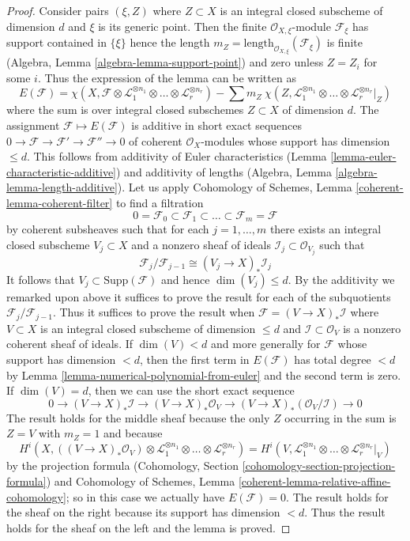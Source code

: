 \begin{proof}
Consider pairs $(\xi , Z)$ where $Z \subset X$ is an integral
closed subscheme of dimension $d$ and $\xi$ is its generic point.
Then the finite $\mathcal{O}_{X, \xi}$-module $\mathcal{F}_\xi$
has support contained in $\{\xi\}$ hence the length
$m_Z = \text{length}_{\mathcal{O}_{X, \xi}}(\mathcal{F}_\xi)$
is finite (Algebra, Lemma \ref{algebra-lemma-support-point})
and zero unless $Z = Z_i$ for some $i$. Thus the expression
of the lemma can be written as
$$
E(\mathcal{F}) =
\chi(X, \mathcal{F} \otimes \mathcal{L}_1^{\otimes n_1} \otimes \ldots \otimes
\mathcal{L}_r^{\otimes n_r}) -
\sum\nolimits
m_Z\ \chi(Z, \mathcal{L}_1^{\otimes n_1} \otimes \ldots \otimes
\mathcal{L}_r^{\otimes n_r}|_Z)
$$
where the sum is over integral closed subschemes $Z \subset X$
of dimension $d$. The assignment $\mathcal{F} \mapsto E(\mathcal{F})$
is additive in short exact sequences
$0 \to \mathcal{F} \to \mathcal{F}' \to \mathcal{F}'' \to 0$
of coherent $\mathcal{O}_X$-modules whose support has dimension
$\leq d$. This follows from additivity of Euler characteristics
(Lemma \ref{lemma-euler-characteristic-additive})
and additivity of lengths
(Algebra, Lemma \ref{algebra-lemma-length-additive}).
Let us apply Cohomology of Schemes, Lemma \ref{coherent-lemma-coherent-filter}
to find a filtration
$$
0 = \mathcal{F}_0 \subset \mathcal{F}_1 \subset
\ldots \subset \mathcal{F}_m = \mathcal{F}
$$
by coherent subsheaves such that for each $j = 1, \ldots, m$
there exists an integral closed subscheme $V_j \subset X$
and a nonzero sheaf of ideals $\mathcal{I}_j \subset \mathcal{O}_{V_j}$
such that
$$
\mathcal{F}_j/\mathcal{F}_{j - 1}
\cong (V_j \to X)_* \mathcal{I}_j
$$
It follows that $V_j \subset \text{Supp}(\mathcal{F})$ and
hence $\dim(V_j) \leq d$.
By the additivity we remarked upon above it suffices to
prove the result for each of the subquotients
$\mathcal{F}_j/\mathcal{F}_{j - 1}$. Thus it suffices to prove
the result when $\mathcal{F} = (V \to X)_*\mathcal{I}$ where
$V \subset X$ is an integral closed subscheme of dimension $\leq d$
and $\mathcal{I} \subset \mathcal{O}_V$ is a nonzero coherent
sheaf of ideals. If $\dim(V) < d$ and more generally for $\mathcal{F}$
whose support has dimension $< d$, then the first term
in $E(\mathcal{F})$ has total degree $< d$ by
Lemma \ref{lemma-numerical-polynomial-from-euler}
and the second term is zero. If $\dim(V) = d$, then we can use the
short exact sequence
$$
0 \to (V \to X)_*\mathcal{I} \to (V \to X)_*\mathcal{O}_V
\to (V \to X)_*(\mathcal{O}_V/\mathcal{I}) \to 0
$$
The result holds for the middle sheaf because
the only $Z$ occurring in the sum is $Z = V$
with $m_Z = 1$ and because
$$
H^i(X, ((V \to X)_*\mathcal{O}_V) \otimes 
 \mathcal{L}_1^{\otimes n_1} \otimes \ldots \otimes
\mathcal{L}_r^{\otimes n_r}) =
H^i(V,  \mathcal{L}_1^{\otimes n_1} \otimes \ldots \otimes
\mathcal{L}_r^{\otimes n_r}|_V)
$$
by the projection formula
(Cohomology, Section \ref{cohomology-section-projection-formula}) and
Cohomology of Schemes, Lemma
\ref{coherent-lemma-relative-affine-cohomology};
so in this case we actually have $E(\mathcal{F}) = 0$.
The result holds for the sheaf on the right because its support
has dimension $< d$. Thus the result holds for the sheaf on the
left and the lemma is proved.
\end{proof}
